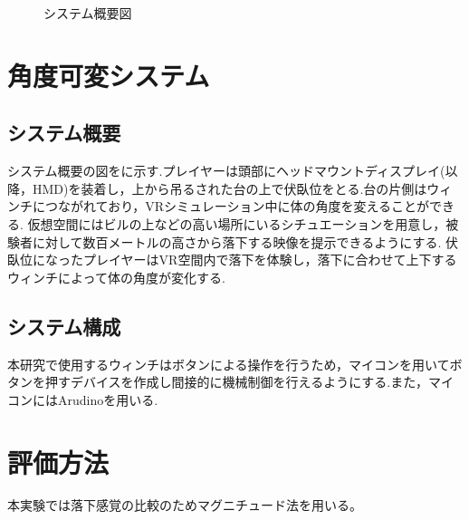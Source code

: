 \documentclass[uplatex]{jsarticle}
\begin{document}
 \begin{figure}[tb]
  \centering
  \caption{システム概要図}
  \label{fig:about_system}

\end{figure}

\section{角度可変システム}
\subsection{システム概要}
システム概要の図をに示す.プレイヤーは頭部にヘッドマウントディスプレイ(以降，HMD)を装着し，上から吊るされた台の上で伏臥位をとる.台の片側はウィンチにつながれており，VRシミュレーション中に体の角度を変えることができる.
仮想空間にはビルの上などの高い場所にいるシチュエーションを用意し，被験者に対して数百メートルの高さから落下する映像を提示できるようにする.
伏臥位になったプレイヤーはVR空間内で落下を体験し，落下に合わせて上下するウィンチによって体の角度が変化する.

\subsection{システム構成}
本研究で使用するウィンチはボタンによる操作を行うため，マイコンを用いてボタンを押すデバイスを作成し間接的に機械制御を行えるようにする.また，マイコンにはArudinoを用いる.

\section{評価方法}
本実験では落下感覚の比較のためマグニチュード法を用いる。
\end{document}
